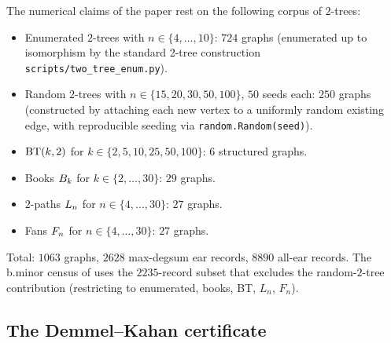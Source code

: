 The numerical claims of the paper rest on the following corpus of
$2$-trees:
\begin{itemize}
\item Enumerated $2$-trees with $n \in \{4, \ldots, 10\}$: $724$ graphs
(enumerated up to isomorphism by the standard 2-tree construction
\texttt{scripts/two\_tree\_enum.py}).
\item Random $2$-trees with $n \in \{15, 20, 30, 50, 100\}$, $50$ seeds
each: $250$ graphs (constructed by attaching each new vertex to a
uniformly random existing edge, with reproducible seeding via
\texttt{random.Random(seed)}).
\item $\mathrm{BT}(k,2)$ for $k \in \{2, 5, 10, 25, 50, 100\}$: $6$
structured graphs.
\item Books $B_{k}$ for $k \in \{2, \ldots, 30\}$: $29$ graphs.
\item $2$-paths $L_{n}$ for $n \in \{4, \ldots, 30\}$: $27$ graphs.
\item Fans $F_{n}$ for $n \in \{4, \ldots, 30\}$: $27$ graphs.
\end{itemize}
Total: $1063$ graphs, $2628$ max-degsum ear records, $8890$ all-ear
records. The b.minor census of  uses the
$2235$-record subset that excludes the random-$2$-tree contribution
(restricting to enumerated, books, BT, $L_{n}$, $F_{n}$).

\subsection{The Demmel--Kahan certificate}\label{app:repro:DK}

